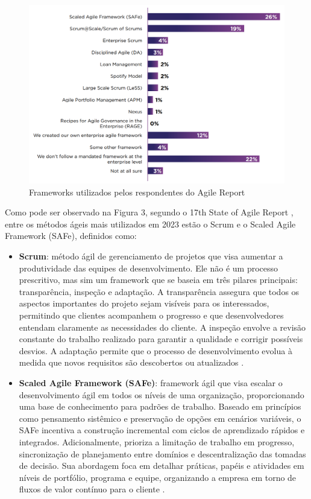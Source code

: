 \documentclass[
	12pt,
	openright,
	twoside,
	a4paper,
	english,
	brazil
	]{abntex2}
\begin{document}
\begin{figure}[H]
	\caption{\label{annual-agile-report}Frameworks utilizados pelos respondentes do Agile Report}
  \includegraphics[width=\textwidth]{annual-agile-report}
\end{figure}

Como pode ser observado na Figura 3, segundo o 17th State of Agile Report \cite{17_agile_report}, entre os métodos ágeis mais utilizados em 2023 estão o Scrum e o Scaled Agile Framework (SAFe), definidos como:
\begin{itemize}
  \item \textbf{Scrum}: método ágil de gerenciamento de projetos que visa aumentar a produtividade das equipes de desenvolvimento. Ele não é um processo prescritivo, mas sim um framework que se baseia em três pilares principais: transparência, inspeção e adaptação. A transparência assegura que todos os aspectos importantes do projeto sejam visíveis para os interessados, permitindo que clientes acompanhem o progresso e que desenvolvedores entendam claramente as necessidades do cliente. A inspeção envolve a revisão constante do trabalho realizado para garantir a qualidade e corrigir possíveis desvios. A adaptação permite que o processo de desenvolvimento evolua à medida que novos requisitos são descobertos ou atualizados \cite{wazlawick2019}.
  \item \textbf{Scaled Agile Framework (SAFe)}: framework ágil que visa escalar o desenvolvimento ágil em todos os níveis de uma organização, proporcionando uma base de conhecimento para padrões de trabalho. Baseado em princípios como pensamento sistêmico e preservação de opções em cenários variáveis, o SAFe incentiva a construção incremental com ciclos de aprendizado rápidos e integrados. Adicionalmente, prioriza a limitação de trabalho em progresso, sincronização de planejamento entre domínios e descentralização das tomadas de decisão. Sua abordagem foca em detalhar práticas, papéis e atividades em níveis de portfólio, programa e equipe, organizando a empresa em torno de fluxos de valor contínuo para o cliente \cite{AgileGuide}.
\end{itemize}
\end{document}
